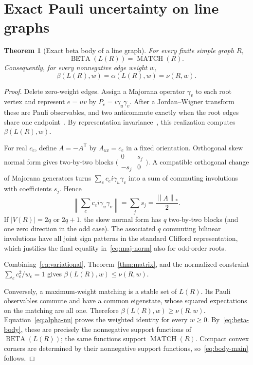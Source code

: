 \documentclass[11pt,a4paper]{article}
\newtheorem{theorem}{Theorem}[section]
\theoremstyle{remark}
\newcommand{\norm}[1]{\left\lVert#1\right\rVert}
\newcommand{\MATCH}{\operatorname{MATCH}}
\newcommand{\BETA}{\operatorname{BETA}}
\begin{document}
\section{Exact Pauli uncertainty on line graphs}

\begin{theorem}[Exact beta body of a line graph]
\label{thm:main}
For every finite simple graph $R$,
\begin{equation}\label{eq:body-main}
 \boxed{\BETA(L(R))=\MATCH(R).}
\end{equation}
Consequently, for every nonnegative edge weight $w$,
\begin{equation}\label{eq:main}
 \boxed{\beta(L(R),w)=\alpha(L(R),w)=\nu(R,w).}
\end{equation}
\end{theorem}

\begin{proof}
Delete zero-weight edges. Assign a Majorana operator $\gamma_v$ to each root
vertex and represent $e=uv$ by $P_e=i\gamma_u\gamma_v$. After a
Jordan--Wigner transform these are Pauli observables, and two anticommute
exactly when the root edges share one endpoint~\cite{cf}. By representation
invariance~\cite{xu}, this realization computes $\beta(L(R),w)$.

For real $c_e$, define $A=-A^{\mathsf T}$ by $A_{uv}=c_e$ in a fixed
orientation. Orthogonal skew normal form gives two-by-two blocks
$\bigl(\begin{smallmatrix}0&s_j\\-s_j&0\end{smallmatrix}\bigr)$. A compatible
orthogonal change of Majorana generators turns
$\sum_ec_ei\gamma_u\gamma_v$ into a sum of commuting involutions with
coefficients $s_j$. Hence
\begin{equation}\label{eq:maj-norm}
 \norm{\sum_ec_ei\gamma_u\gamma_v}=\sum_js_j=\frac{\norm{A}_*}{2}.
\end{equation}
If $|V(R)|=2q$ or $2q+1$, the skew normal form has $q$ two-by-two blocks
(and one zero direction in the odd case). The associated $q$ commuting
bilinear involutions have all joint sign patterns in the standard Clifford
representation, which justifies the final equality in~\eqref{eq:maj-norm}
also for odd-order roots.

Combining~\eqref{eq:variational}, Theorem~\ref{thm:matrix}, and the normalized
constraint $\sum_ec_e^2/w_e=1$ gives
$\beta(L(R),w)\leq\nu(R,w)$.

Conversely, a maximum-weight matching is a stable set of $L(R)$. Its Pauli
observables commute and have a common eigenstate, whose squared expectations
on the matching are all one. Therefore
$\beta(L(R),w)\geq\nu(R,w)$. Equation~\eqref{eq:alpha-nu} proves the weighted
identity for every $w\geq0$. By~\eqref{eq:beta-body}, these are precisely the
nonnegative support functions of $\BETA(L(R))$; the same functions support
$\MATCH(R)$. Compact convex corners are determined by their nonnegative
support functions, so~\eqref{eq:body-main} follows.
\end{proof}
\end{document}

